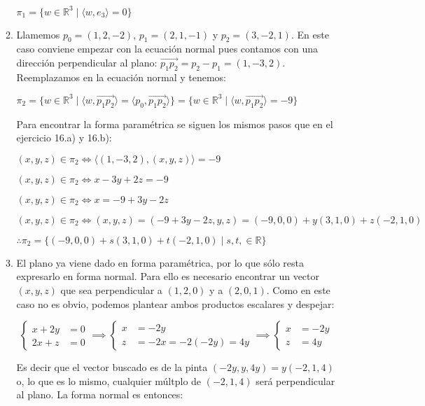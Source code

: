 \begin{enumerate}[resume,topsep=6pt, itemsep=.4cm]
\begin{enumerate}
$\pi_1 = \boxed{ \{ w \in \mathbb{R}^3 \; | \; \langle w,e_3 \rangle = 0  \} }$

	\item Llamemos $p_0 = (1,2,-2)$, $p_1 = (2,1,-1)$ y $p_2=(3,-2,1)$. En este caso conviene empezar con la ecuación normal pues contamos con una dirección perpendicular al plano: $\overrightarrow{p_1 p_2} = p_2 - p_1 = (1,-3,2)$. Reemplazamos en la ecuación normal y tenemos:
	
$\pi_2 = \{ w \in \mathbb{R}^3 \; | \; \langle w, \overrightarrow{p_1 p_2} \rangle =  \langle p_0, \overrightarrow{p_1 p_2} \rangle \} = \boxed{ \{ w \in \mathbb{R}^3 \; | \; \langle w, \overrightarrow{p_1 p_2} \rangle =  -9 \} }$

Para encontrar la forma paramétrica se siguen los mismos pasos que en el ejercicio 16.a) y 16.b):

$ (x,y,z) \in \pi_2 \iff \langle (1,-3,2) , (x,y,z) \rangle = -9$

$ (x,y,z) \in \pi_2 \iff x -3y +2z = -9$

$ (x,y,z) \in \pi_2 \iff x = -9 + 3y -2z$

$ (x,y,z) \in \pi_2 \iff (x,y,z) = (-9 + 3y -2z ,y,z) = (-9,0,0) + y (3,1,0) + z (-2,1,0)$

$ \therefore \boxed{ \pi_2 = \{ (-9,0,0) + s (3,1,0) + t (-2,1,0) \; | \; s,t, \in \mathbb{R} \} }$


	\item El plano ya viene dado en forma paramétrica, por lo que sólo resta expresarlo en forma normal. Para ello es necesario encontrar un vector $(x,y,z)$ que sea perpendicular a $(1,2,0)$ y a $(2,0,1)$. Como en este caso no es obvio, podemos plantear ambos productos escalares y despejar:
	
\begin{equation*}
\left\{ \begin{array}{rl}
x + 2 y &= 0 \\
2x+z &= 0
\end{array} \right. \implies
\left\{ \begin{array}{rl}
x &= -2y \\
z &= -2x = -2 (-2y) = 4y
\end{array} \right. \implies
\left\{ \begin{array}{rl}
x &= -2y \\
z &= 4y
\end{array} \right.
\end{equation*}

Es decir que el vector buscado es de la pinta $(-2y,y,4y) = y(-2,1,4)$ o, lo que es lo mismo, cualquier múltplo de $(-2,1,4)$ será perpendicular al plano. La forma normal es entonces:


\end{enumerate}
\end{enumerate}
